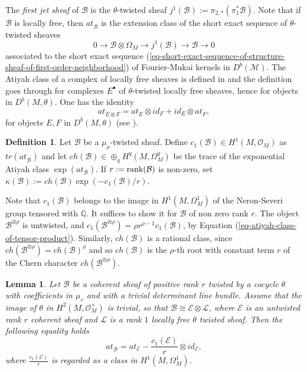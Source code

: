 \documentclass[12pt]{amsart}
\numberwithin{equation}{subsection}
\theoremstyle{plain}
\newtheorem{lem}[thm]{Lemma}
\theoremstyle{definition}
\newtheorem{defi}[thm]{Definition}
\newcommand{\B}{{\mathcal B}}
\newcommand{\E}{{\mathcal E}}
\newcommand{\LB}{{\mathcal L}}
\newcommand{\QQ}{{\mathbb Q}}
\newcommand{\M}{{\mathcal M}}
\newcommand{\StructureSheaf}[1]{{\mathcal O}_{#1}}
\newcommand{\rank}{{\rm rank}}
\begin{document}
The {\em first jet sheaf} of $\B$ is the $\theta$-twisted sheaf 
$j^1(\B):=\pi_{2,*}(\pi_1^*\B)$.
Note that if $\B$ is locally free, then $at_\B^{}$ is the extension class
of the short exact sequence of $\theta$-twisted sheaves
\[
0\rightarrow \B\otimes \Omega_M\rightarrow j^1(\B)\rightarrow \B\rightarrow 0
\]
associated to the short exact sequence (\ref{eq-short-exact-sequence-of-structure-sheaf-of-first-order-neighborhood}) of Fourier-Mukai kernels in $D^b(\M)$.
The Atiyah class of a complex of locally free sheaves is defined in \cite[Sec 10.1]{huybrechts-lehn} and the definition goes through for complexes $E^\bullet$ 
of $\theta$-twisted locally free sheaves, hence for objects in $D^b(M,\theta)$. One has the identity 
\begin{equation}
\label{eq-atiyah-class-of-tensor-product}
at^{}_{E\otimes F}=at^{}_{E}\otimes id_{F}+id_{E}\otimes at^{}_{F}, 
\end{equation}
for objects $E, F$ in $D^b(M,\theta)$ (see \cite[Sec 10.1]{huybrechts-lehn}). 


\begin{defi}
\label{def-kappa-B}
Let $\B$ be a $\mu_\rho$-twisted sheaf. Define $c_1(\B)\in H^1(M,\StructureSheaf{M})$ as $tr(at^{}_\B)$ and let $ch(\B)\in\oplus_q H^q(M,\Omega^q_M)$ be the trace of the exponential Atiyah class $\exp(at^{}_\B)$. If $r:=\rank(\B)$ is non-zero, set $\kappa(\B):=ch(\B)\exp(-c_1(\B)/r)$.
\end{defi}

Note that $c_1(\B)$ belongs to the image in $H^1(M,\Omega^1_M)$ of the Neron-Severi group tensored with $\QQ$. It suffices to show it for $\B$ of non zero rank $r$. The object $\B^{\otimes \rho}$ is untwisted, and $c_1(\B^{\otimes \rho})=\rho r^{\rho-1}c_1(\B)$, by Equation (\ref{eq-atiyah-class-of-tensor-product}). Similarly, 
$ch(\B)$ is a rational class, since
$ch(\B^{\otimes \rho})=ch(\B)^\rho$ and so $ch(\B)$ is the $\rho$-th root with constant term $r$ of the Chern character $ch(\B^{\otimes \rho})$.


\begin{lem}
Let $\B$ be a coherent sheaf of positive rank $r$ twisted by a cocycle $\theta$ with coefficients in $\mu_r$ and with a trivial determinant line bundle. 
Assume that the image of $\theta$ in $H^2(M,\StructureSheaf{M}^\times)$ is trivial, so that $\B\cong\E\otimes \LB$, where $\E$ is an untwisted rank $r$ coherent sheaf and $\LB$ is a rank $1$ locally free $\theta$ twisted sheaf. Then the following equality holds
\begin{equation}
\label{eq-atiya-class-of-twisted-B-versus-that-of-E}
at^{}_\B=at_\E-\frac{c_1(\E)}{r}\otimes id_\E,
\end{equation}
where $\frac{c_1(\E)}{r}$ is regarded as a class in $H^1(M,\Omega^1_M)$.
\end{lem}
\end{document}
